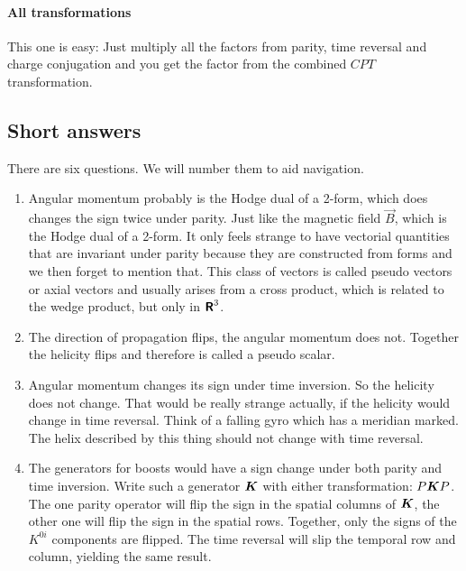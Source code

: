\documentclass[11pt, english, fleqn, DIV=15, headinclude, BCOR=1cm]{scrartcl}
\begin{document}
\paragraph{All transformations}

This one is easy: Just multiply all the factors from parity, time reversal and
charge conjugation and you get the factor from the combined $CPT$
transformation.

\label{page:end_of_1_1}

\subsection{Short answers}

There are six questions. We will number them to aid navigation.

\begin{enumerate}
    \item
        Angular momentum probably is the Hodge dual of a 2-form, which does
        changes the sign twice under parity. Just like the magnetic field $\vec
        B$, which is the Hodge dual of a 2-form. It only feels strange to have
        vectorial quantities that are invariant under parity because they are
        constructed from forms and we then forget to mention that. This class
        of vectors is called pseudo vectors or axial vectors and usually arises
        from a cross product, which is related to the wedge product, but only
        in $\text{\bfseries\sffamily R}^3$.

    \item
        The direction of propagation flips, the angular momentum does not.
        Together the helicity flips and therefore is called a pseudo scalar.

    \item
        Angular momentum changes its sign under time inversion. So the helicity
        does not change. That would be really strange actually, if the helicity
        would change in time reversal. Think of a falling gyro which has a
        meridian marked. The helix described by this thing should not change
        with time reversal.

    \item
        The generators for boosts would have a sign change under both parity
        and time inversion. Write such a generator $\mat K$ with either
        transformation: $P \mat K P$. The one parity operator will flip the
        sign in the spatial columns of $\mat K$, the other one will flip the
        sign in the spatial rows. Together, only the signs of the $K^{0i}$
        components are flipped. The time reversal will slip the temporal row
        and column, yielding the same result.


\end{enumerate}
\end{document}
